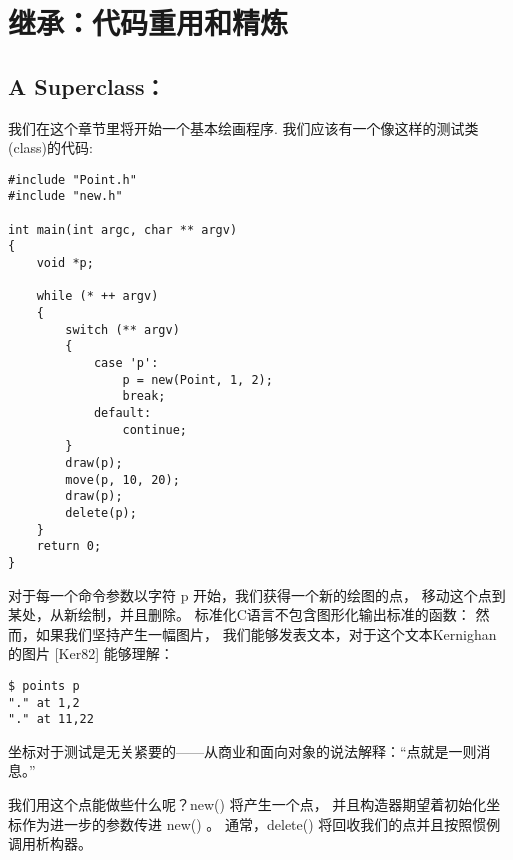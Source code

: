 

\chapter{继承：代码重用和精炼}
\label{ch:Inheritance}

\section{A Superclass：}

我们在这个章节里将开始一个基本绘画程序.
我们应该有一个像这样的测试类(class)的代码:

\begin{lstlisting}
#include "Point.h"
#include "new.h"

int main(int argc, char ** argv)
{
    void *p;
    
    while (* ++ argv)
    {
        switch (** argv)
        {
            case 'p':
                p = new(Point, 1, 2);
                break;
            default:
                continue;
        }
        draw(p);
        move(p, 10, 20);
        draw(p);
        delete(p);
    }
    return 0;
}
\end{lstlisting}


对于每一个命令参数以字符 p 开始，我们获得一个新的绘图的点，
移动这个点到某处，从新绘制，并且删除。
标准化C语言不包含图形化输出标准的函数：
然而，如果我们坚持产生一幅图片，
我们能够发表文本，对于这个文本Kernighan 的图片 [Ker82] 能够理解：

\begin{lstlisting}
$ points p
"." at 1,2
"." at 11,22
\end{lstlisting}

坐标对于测试是无关紧要的——从商业和面向对象的说法解释：“点就是一则消息。”


我们用这个点能做些什么呢？new() 将产生一个点，
并且构造器期望着初始化坐标作为进一步的参数传进 new() 。
通常，delete() 将回收我们的点并且按照惯例调用析构器。


